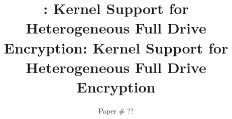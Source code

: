 















\def \mytitle {\sys: Navigating Tradeoffs in Stream Cipher Based Full Drive Encryption}

\def \mytitle {\sys: ?????????????}

\def \mytitle {\sys: Kernel Support for Heterogeneous Full Drive Encryption}


\title{\textsf{\textbf{\mytitle}}}

\title{\textsf{\mytitle}}


\author{Paper \# ??}


\date{}


\maketitle


